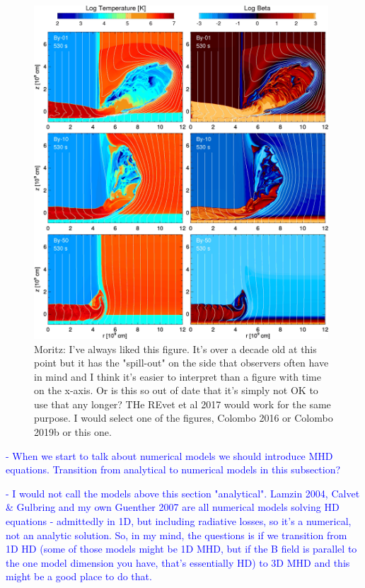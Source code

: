 \begin{figure}
    \centering
    \includegraphics[width=11cm]{figs/Sacco2010.png}
    \caption{Moritz: I've always liked this figure. It's over a decade old at this point but it has the "spill-out" on the side that observers often have in mind and I think it's easier to interpret than a figure with time on the x-axis. Or is this so out of date that it's simply not OK to use that any longer? THe REvet et al 2017 would work for the same purpose. I would select one of the figures, Colombo 2016 or Colombo 2019b or this one.}
    \label{fig:sacco2016}
\end{figure}

\textcolor{blue}{
- When we start to talk about numerical models we should introduce MHD equations. Transition from analytical to numerical models in this subsection?}

\textcolor{blue}{- I would not call the models above this section "analytical". Lamzin 2004, Calvet \& Gulbring and my own Guenther 2007 are all numerical models solving HD equations - admittedly in 1D, but including radiative losses, so it's a numerical, not an analytic solution. So, in my mind, the questions is if we transition from 1D HD (some of those models might be 1D MHD, but if the B field is parallel to the one model dimension you have, that's essentially HD) to 3D MHD and this might be a good place to do that.}

